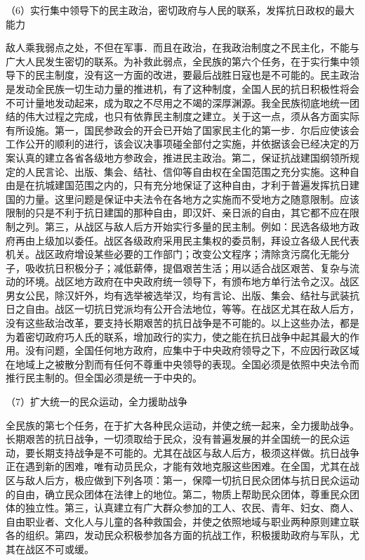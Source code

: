 \documentclass[UTF8, 12pt, a4paper]{ctexrep}
\begin{document}
（6）实行集中领导下的民主政治，密切政府与人民的联系，发挥抗日政权的最大能力

敌人乘我弱点之处，不但在军事．而且在政治，在我政治制度之不民主化，不能与广大人民发生密切的联系。为补救此弱点，全民族的第六个任务，在于实行集中领导下的民主制度，没有这一方面的改进，要最后战胜日寇也是不可能的。民主政治是发动全民族一切生动力量的推进机，有了这种制度，全国人民的抗日积极性将会不可计量地发动起来，成为取之不尽用之不竭的深厚渊源。我全民族彻底地统一团结的伟大过程之完成，也只有依靠民主制度之建立。关于这一点，须从各方面实际有所设施。第一，国民参政会的开会已开始了国家民主化的第一步．尔后应使该会工作公开的顺利的进行，该会议决事项碰全部付之实施，并依据该会已经决定的万案认真的建立各省各级地方参政会，推进民主政治。第二，保证抗战建国纲领所规定的人民言论、出版、集会、结社、信仰等自由权在全国范围之充分实施。这种自由是在抗城建国范围之内的，只有充分地保证了这种自由，才利于普遍发挥抗日建国的力量。这里问题是保证中夫法令在各地方之实施而不受地方之随意限制。应该限制的只是不利于抗日建国的那种自由，即汉奸、亲日派的自由，其它都不应在限制之列。第三，从战区与敌人后方开始实行多量的民主制。例如：民选各级地方政府再由上级加以委任。战区各级政府采用民主集权的委员制，拜设立各级人民代表机关。战区政府增设某些必要的工作部门；改变公文程序；清除贪污腐化无能分子，吸收抗日积极分子；减低薪俸，提倡艰苦生活；用以适合战区艰苦、复杂与流动的环境。战区地方政府在中央政府统一领导下，有颁布地方单行法令之汉。战区男女公民，除汉奸外，均有选举被选举汉，均有言论、出版、集会、结社与武装抗日之自由。战区一切抗日党派均有公开合法地位，等等。在战区尤其在敌人后方，没有这些敌治改革，要支持长期艰苦的抗日战争是不可能的。以上这些办法，都是为着密切政府巧人氏的联系，增加政行的实力，使之能在抗日战争中起其最大的作用。没有问题，全国任何地方政府，应集中于中央政府领导之下，不应因行政区域在地域上之被散分割而有任何不尊重中央领导的表现。全国必须是依照中央法令而推行民主制的。但全国必须是统一于中央的。

（7）扩大统一的民众运动，全力援助战争

全民族的第七个任务，在于扩大各种民众运动，并使之统一起来，全力援助战争。长期艰苦的抗日战争，一切须取给于民众，没有普遍发展的并全国统一的民众运动，要长期支持战争是不可能的。尤其在战区与敌人后方，极须这样做。抗日战争正在遇到新的困难，唯有动员民众，才能有效地克服这些困难。在全国，尤其在战区与敌人后方，极应做到下列各项：第一，保障一切抗日民众团体与抗日民众运动的自由，确立民众团体在法律上的地位。第二，物质上帮助民众团体，尊重民众团体的独立性。第三，认真建立有广大群众参加的工人、农民、青年、妇女、商人、自由职业者、文化人与儿童的各种救国会，并使之依照地域与职业两种原则建立联各的组织。第四，发动民众积极参加各方面的抗战工作，积极援助政府与军队，尤其在战区不可或缓。
\end{document}
